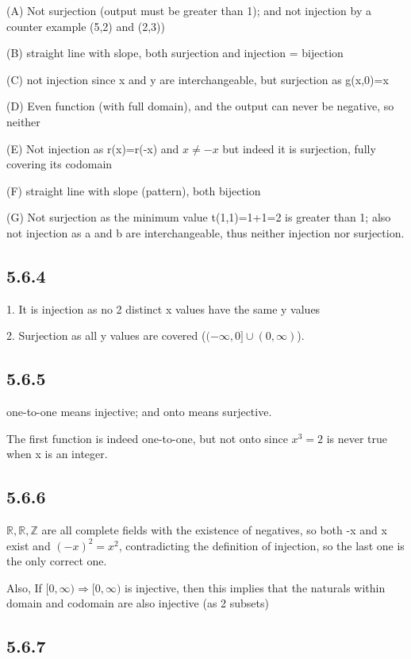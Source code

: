 \documentclass{article}
\begin{document}
(A) Not surjection (output must be greater than 1); and not injection by a counter example (5,2) and (2,3)) 

(B) straight line with slope, both surjection and injection = bijection 

(C) not injection since x and y are interchangeable, but surjection as g(x,0)=x

(D) Even function (with full domain), and  the output can never be negative, so neither

(E) Not injection as r(x)=r(-x) and $x\neq -x$ but indeed it is surjection, fully covering its codomain

(F) straight line with slope (pattern), both bijection 

(G) Not surjection as the minimum value t(1,1)=1+1=2 is greater than 1; also not injection as a and b are interchangeable, thus neither injection nor surjection. 

\subsection*{5.6.4}

1. It is injection as no 2 distinct x values have the same y values

2. Surjection as all y values are covered ($(-\infty,0]\cup (0,\infty)$).

\subsection*{5.6.5}

one-to-one means injective; and onto means surjective.

The first function is indeed one-to-one, but not onto since $x^3=2$ is never true when x is an integer. 

\subsection*{5.6.6}

$\mathbb{R},\mathbb{R},\mathbb{Z}$ are all complete fields with the existence of negatives, so both -x and x exist and $(-x)^2=x^2$, contradicting the definition of injection, so the last one is the only correct one. 

Also, If $[0,\infty)\Rightarrow[0,\infty)$ is injective, then this implies that the naturals within domain and codomain are also injective (as 2 subsets)

\subsection*{5.6.7}
\end{document}
